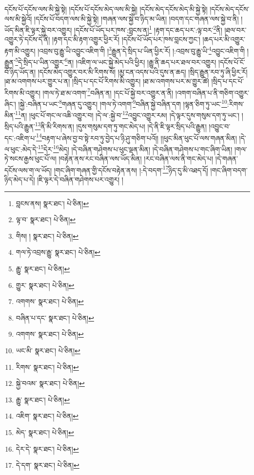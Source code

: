དངོས་པོ་དངོས་ལས་མི་སྐྱེ་སྟེ། །དངོས་པོ་དངོས་མེད་ལས་མི་སྐྱེ། །དངོས་མེད་དངོས་མེད་མི་སྐྱེ་སྟེ། །དངོས་མེད་དངོས་ལས་མི་སྐྱེའོ། །དངོས་པོ་བདག་ལས་མི་སྐྱེ་སྟེ། །གཞན་ལས་སྐྱེ་བ་ཉིད་མ་ཡིན། །བདག་དང་གཞན་ལས་སྐྱེ་བ་ནི། །ཡོད་མིན་ཇི་ལྟར་སྐྱེ་བར་འགྱུར། །དངོས་པོ་ཡོད་པར་ཁས་:བླངས་ན།\footnote{བླངས་ནས།  སྣར་ཐང་།  པེ་ཅིན། } །རྟག་དང་ཆད་པར་:ལྟ་བར་\footnote{ལྟ་བ་  སྣར་ཐང་།  པེ་ཅིན། }ནི། །ཐལ་བར་འགྱུར་ཏེ་དངོས་དེ་ནི། །རྟག་དང་མི་རྟག་འགྱུར་ཕྱིར་རོ། །དངོས་པོ་ཡོད་པར་ཁས་བླངས་ཀྱང་། །ཆད་པར་མི་འགྱུར་རྟག་མི་འགྱུར། །འབྲས་བུ་རྒྱུ་ཡི་འབྱུང་འཇིག་གི །\footnote{གིས། །  སྣར་ཐང་།  པེ་ཅིན། }རྒྱུན་དེ་སྲིད་པ་ཡིན་ཕྱིར་རོ། །:འབྲས་བུ་རྒྱུ་ཡི་\footnote{གལ་ཏེ་འབྲས་རྒྱུ་  སྣར་ཐང་།  པེ་ཅིན། }འབྱུང་འཇིག་གི །རྒྱུན་\footnote{རྒྱུ་  སྣར་ཐང་།  པེ་ཅིན། }དེ་སྲིད་པ་ཡིན་འགྱུར་\footnote{གྱུར་  སྣར་ཐང་།  པེ་ཅིན། }ན། །འཇིག་ལ་ཡང་སྐྱེ་མེད་པའི་ཕྱིར། །རྒྱུ་ནི་ཆད་པར་ཐལ་བར་འགྱུར། །དངོས་པོ་ངོ་བོ་ཉིད་ཡོད་ན། །དངོས་མེད་འགྱུར་བར་མི་རིགས་སོ། །མྱ་ངན་འདས་པའི་དུས་ན་ཆད། །སྲིད་རྒྱུན་རབ་ཏུ་ཞི་ཕྱིར་རོ། །ཐ་མ་འགགས་པར་གྱུར་པ་ན། །སྲིད་པ་དང་པོ་རིགས་མི་འགྱུར། །ཐ་མ་འགགས་པར་མ་གྱུར་ཚེ། །སྲིད་པ་དང་པོ་རིགས་མི་འགྱུར། །གལ་ཏེ་ཐ་མ་འགག་\footnote{འགགས་  སྣར་ཐང་།  པེ་ཅིན། }བཞིན་ན། །དང་པོ་སྐྱེ་བར་འགྱུར་ན་ནི། །འགག་བཞིན་པ་ནི་གཅིག་འགྱུར་ཞིང་། །སྐྱེ་:བཞིན་པ་ཡང་\footnote{བཞིན་པ་དང་  སྣར་ཐང་།  པེ་ཅིན། }གཞན་དུ་འགྱུར། །གལ་ཏེ་འགག་\footnote{འགགས་  སྣར་ཐང་།  པེ་ཅིན། }བཞིན་སྐྱེ་བཞིན་དག །ལྷན་ཅིག་ཏུ་ཡང་\footnote{ཡང་མི་  སྣར་ཐང་།  པེ་ཅིན། }:རིགས་མིན་\footnote{རིགས་  སྣར་ཐང་།  པེ་ཅིན། }ན། །ཕུང་པོ་གང་ལ་འཆི་འགྱུར་བ། །དེ་ལ་:སྐྱེ་བ་\footnote{སྐྱེ་བའམ་  སྣར་ཐང་།  པེ་ཅིན། }འབྱུང་འགྱུར་རམ། །དེ་ལྟར་དུས་གསུམ་དག་ཏུ་ཡང་། །སྲིད་པའི་རྒྱུན་\footnote{རྒྱུ་  སྣར་ཐང་།  པེ་ཅིན། }ནི་མི་རིགས་ན། །དུས་གསུམ་དག་ཏུ་གང་མེད་པ། །དེ་ནི་ཇི་ལྟར་སྲིད་པའི་རྒྱུན། །འབྱུང་བ་དང་:འཇིག་པ་\footnote{འཇིག་  སྣར་ཐང་།  པེ་ཅིན། }བརྟག་པ་ཞེས་བྱ་བ་སྟེ་རབ་ཏུ་བྱེད་པ་ཉི་ཤུ་གཅིག་པའོ།། །།ཕུང་མིན་ཕུང་པོ་ལས་གཞན་མིན། །དེ་ལ་ཕུང་:མེད་དེ་\footnote{མེད་  སྣར་ཐང་།  པེ་ཅིན། }དེར་\footnote{དེར་དེ་  སྣར་ཐང་།  པེ་ཅིན། }མེད། །དེ་བཞིན་གཤེགས་པ་ཕུང་ལྡན་མིན། །དེ་བཞིན་གཤེགས་པ་གང་ཞིག་ཡིན། །གལ་ཏེ་སངས་རྒྱས་ཕུང་པོ་ལ། །བརྟེན་ནས་རང་བཞིན་ལས་ཡོད་མིན། །རང་བཞིན་ལས་ནི་གང་མེད་པ། །དེ་གཞན་དངོས་ལས་ག་ལ་ཡོད། །གང་ཞིག་གཞན་གྱི་དངོས་བརྟེན་ནས། །:དེ་བདག་\footnote{དེ་དག་  སྣར་ཐང་།  པེ་ཅིན། }ཉིད་དུ་མི་འཐད་དོ། །གང་ཞིག་བདག་ཉིད་མེད་པ་དེ། །ཇི་ལྟར་དེ་བཞིན་གཤེགས་པར་འགྱུར། །
